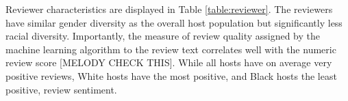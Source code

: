 Reviewer characteristics are displayed in Table \ref{table:reviewer}. The reviewers have similar gender diversity as the overall host population but significantly less racial diversity. Importantly, the measure of review quality assigned by the machine learning algorithm to the review text correlates well with the numeric review score [MELODY CHECK THIS]. While all hosts have on average very positive reviews, White hosts have the most positive, and Black hosts the least positive, review sentiment. 









